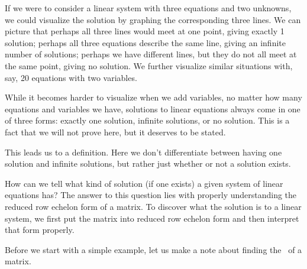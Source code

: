 If we were to consider a linear system with three equations and two unknowns, we could visualize the solution by graphing the corresponding three lines. We can picture that perhaps all three lines would meet at one point, giving exactly 1 solution; perhaps all three equations describe the same line, giving an infinite number of solutions; perhaps we have different lines, but they do not all meet at the same point, giving no solution. We further visualize similar situations with, say, 20 equations with two variables.

While it becomes harder to visualize when we add variables, no matter how many equations and variables we have, solutions to linear equations always come in one of three forms: exactly one solution, infinite solutions, or no solution. This is a fact that we will not prove here, but it deserves to be stated.

 

This leads us to a definition. Here we don't differentiate between having one solution and infinite solutions, but rather just whether or not a solution exists.

   

How can we tell what kind of solution (if one exists) a given system of linear equations has? The answer to this question lies with properly understanding the reduced row echelon form of a matrix. To discover what the solution is to a linear system, we first put the matrix into reduced row echelon form and then interpret that form properly.

Before we start with a simple example, let us make a note about finding the \rref\ of a matrix.\\

